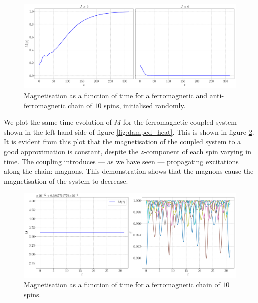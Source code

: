 \begin{figure}[htb]
	\centering
	\includegraphics[width=\columnwidth]{../fig/magnetisation.pdf}
	\caption{Magnetisation as a function of time for a ferromagnetic and anti-ferromagnetic chain of $10$ spins, initialised randomly.}
	\label{fig:magn}
\end{figure}

We plot the same time evolution of $M$ for the ferromagnetic coupled system shown in the left hand side of figure \ref{fig:damped_heat}. This is shown in figure \ref{fig:magn_coupled}. It is evident from this plot that the magnetisation of the coupled system to a good approximation is constant, despite the $z$-component of each spin varying in time. The coupling introduces --- as we have seen --- propagating excitations along the chain: magnons. This demonstration shows that the magnons cause the magnetisation of the system to decrease. 
\begin{figure}[htb]
	\centering
	\includegraphics[width=\columnwidth]{../fig/magnetisation_coupled.pdf}
	\caption{Magnetisation as a function of time for a ferromagnetic chain of $10$ spins.}
	\label{fig:magn_coupled}
\end{figure}
